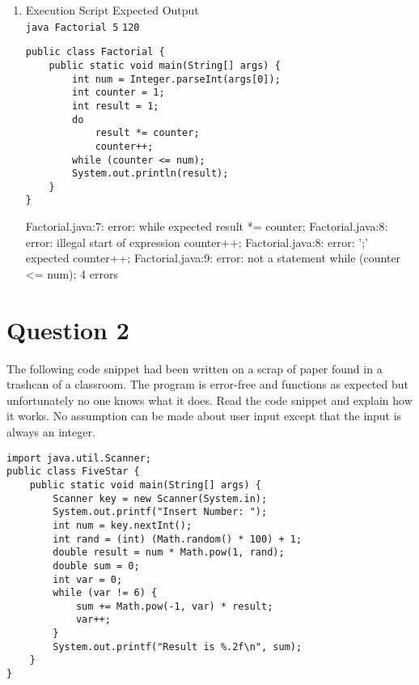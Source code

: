 \documentclass[12pt,letterpaper,twoside]{article}
\begin{document}
\begin{enumerate}[label=\textbf{(\alph*)}]
\begin{lstlisting}
public class SphereSurface {
	public static void main(String[] args) {
		double radius = Double.parseDouble(args[0]);
		double surface = 4 * Math.PI * pow(radius, 2);
		System.out.printf("%.2f\n", surface);
	}
}
\end{lstlisting}

\begin{terminal}
SphereSurface.java:4: error: cannot find symbol
        double surface = 4 * Math.PI * pow(radius, 2);
1 error
\end{terminal}

\newpage

\item Execution Script \hfill Expected Output\\
\texttt{java Factorial 5} \hfill \texttt{120}

\begin{lstlisting}
public class Factorial {
	public static void main(String[] args) {
		int num = Integer.parseInt(args[0]);
		int counter = 1;
		int result = 1;
		do
			result *= counter;
			counter++;
		while (counter <= num);
		System.out.println(result);
	}
}
\end{lstlisting}

\begin{terminal}
Factorial.java:7: error: while expected
	result *= counter;
Factorial.java:8: error: illegal start of expression
	counter++;
Factorial.java:8: error: ';' expected
	counter++;
Factorial.java:9: error: not a statement
	while (counter <= num);
4 errors
\end{terminal}

\end{enumerate}

\newpage

\section*{Question 2}

The following code snippet had been written on a scrap of paper found in a trashcan of a classroom.
The program is error-free and functions as expected but unfortunately no one knows what it does.
Read the code snippet and explain how it works.
No assumption can be made about user input except that the input is always an integer.

\begin{lstlisting}
import java.util.Scanner;
public class FiveStar {
	public static void main(String[] args) {
		Scanner key = new Scanner(System.in);
		System.out.printf("Insert Number: ");
		int num = key.nextInt();
		int rand = (int) (Math.random() * 100) + 1;
		double result = num * Math.pow(1, rand);
		double sum = 0;
		int var = 0;
		while (var != 6) {
			sum += Math.pow(-1, var) * result;
			var++;
		}
		System.out.printf("Result is %.2f\n", sum);
	}
}
\end{lstlisting}
\end{document}
